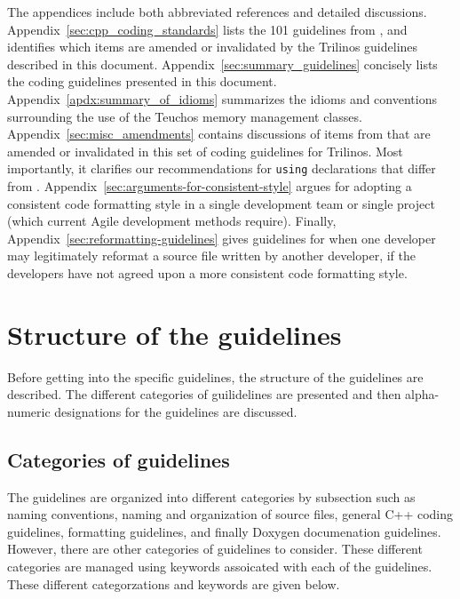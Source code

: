 The appendices include both abbreviated references and detailed
discussions.  Appendix~\ref{sec:cpp_coding_standards} lists the 101
guidelines from {}\cite{C++CodingStandards05}, and identifies which
items are amended or invalidated by the Trilinos guidelines described
in this document.  Appendix~\ref{sec:summary_guidelines} concisely
lists the coding guidelines presented in this document.
Appendix~\ref{apdx:summary_of_idioms} summarizes the idioms and
conventions surrounding the use of the Teuchos memory management
classes.  Appendix~\ref{sec:misc_amendments} contains discussions of
items from {}\cite{C++CodingStandards05} that are amended or
invalidated in this set of coding guidelines for Trilinos.  Most
importantly, it clarifies our recommendations for {}\texttt{using}
declarations that differ from {}\cite[Item 59]{C++CodingStandards05}.
Appendix~\ref{sec:arguments-for-consistent-style} argues for adopting
a consistent code formatting style in a single development team or
single project (which current Agile development methods require).
Finally, Appendix~\ref{sec:reformatting-guidelines} gives guidelines
for when one developer may legitimately reformat a source file written
by another developer, if the developers have not agreed upon a more
consistent code formatting style.


%
\section{Structure of the guidelines}
\label{sec:guideline_structure}
%

Before getting into the specific guidelines, the structure of the
guidelines are described.  The different categories of guilidelines
are presented and then alpha-numeric designations for the guidelines
are discussed.


%
\subsection{Categories of guidelines}
%

The guidelines are organized into different categories by subsection
such as naming conventions, naming and organization of source files,
general C++ coding guidelines, formatting guidelines, and finally
Doxygen documenation guidelines.  However, there are other categories
of guidelines to consider.  These different categories are managed
using keywords assoicated with each of the guidelines.  These
different categorzations and keywords are given below.

